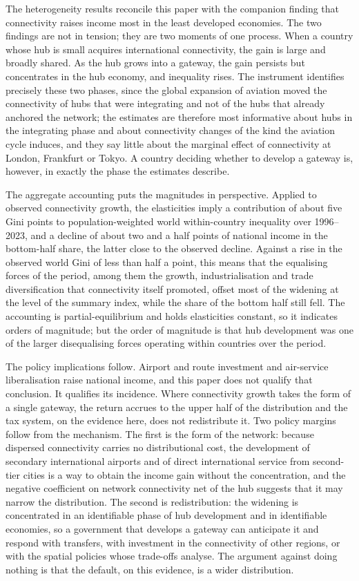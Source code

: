 The heterogeneity results reconcile this paper with the companion finding that connectivity raises income most in the least developed economies. The two findings are not in tension; they are two moments of one process. When a country whose hub is small acquires international connectivity, the gain is large and broadly shared. As the hub grows into a gateway, the gain persists but concentrates in the hub economy, and inequality rises. The instrument identifies precisely these two phases, since the global expansion of aviation moved the connectivity of hubs that were integrating and not of the hubs that already anchored the network; the estimates are therefore most informative about hubs in the integrating phase and about connectivity changes of the kind the aviation cycle induces, and they say little about the marginal effect of connectivity at London, Frankfurt or Tokyo. A country deciding whether to develop a gateway is, however, in exactly the phase the estimates describe.

The aggregate accounting puts the magnitudes in perspective. Applied to observed connectivity growth, the elasticities imply a contribution of about five Gini points to population-weighted world within-country inequality over 1996--2023, and a decline of about two and a half points of national income in the bottom-half share, the latter close to the observed decline. Against a rise in the observed world Gini of less than half a point, this means that the equalising forces of the period, among them the growth, industrialisation and trade diversification that connectivity itself promoted, offset most of the widening at the level of the summary index, while the share of the bottom half still fell. The accounting is partial-equilibrium and holds elasticities constant, so it indicates orders of magnitude; but the order of magnitude is that hub development was one of the larger disequalising forces operating within countries over the period.

The policy implications follow. Airport and route investment and air-service liberalisation raise national income, and this paper does not qualify that conclusion. It qualifies its incidence. Where connectivity growth takes the form of a single gateway, the return accrues to the upper half of the distribution and the tax system, on the evidence here, does not redistribute it. Two policy margins follow from the mechanism. The first is the form of the network: because dispersed connectivity carries no distributional cost, the development of secondary international airports and of direct international service from second-tier cities is a way to obtain the income gain without the concentration, and the negative coefficient on network connectivity net of the hub suggests that it may narrow the distribution. The second is redistribution: the widening is concentrated in an identifiable phase of hub development and in identifiable economies, so a government that develops a gateway can anticipate it and respond with transfers, with investment in the connectivity of other regions, or with the spatial policies whose trade-offs \citet{Fajgelbaum_2020} analyse. The argument against doing nothing is that the default, on this evidence, is a wider distribution.

